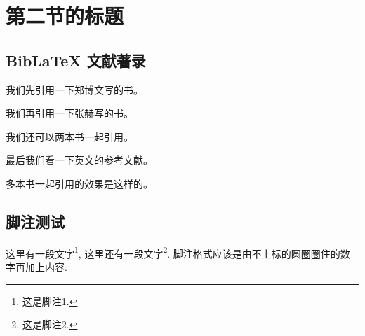 
\section{第二节的标题}

\zhlipsum[1]

\subsection{BibLaTeX 文献著录}

\nocite{*}

我们先引用一下郑博文写的书\cite{rudin1976principleschinese3}。

我们再引用一下张赫写的书\cite{rudin1976principleschinese}。

我们还可以两本书一起引用\cite{rudin1976principleschinese,rudin1976principleschinese3}。

最后我们看一下英文的参考文献\cite{rudin1976principles}。

多本书一起引用的效果是这样的\cite{rudin1976principleschinese,rudin1976principleschinese3, rudin1976principles, rudin1976principleschinese2}。

\zhlipsum[1]

\subsection{脚注测试}

这里有一段文字\footnote{这是脚注1.}, 这里还有一段文字\footnote{这是脚注2.}. 脚注格式应该是由不上标的圆圈圈住的数字再加上内容.

\zhlipsum
